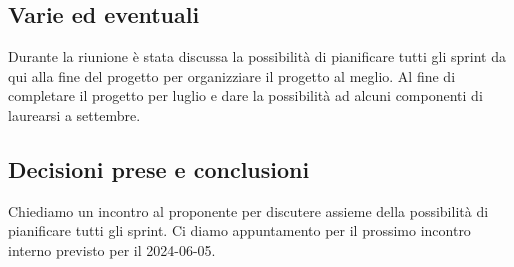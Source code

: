 \documentclass[italian,12pt]{article}
\begin{document}
\subsection{Varie ed eventuali}
Durante la riunione è stata discussa la possibilità di pianificare tutti gli sprint da qui alla fine del progetto per organizziare il progetto al meglio. Al fine di completare il progetto per luglio e dare la possibilità ad alcuni componenti di laurearsi a settembre.

\subsection{Decisioni prese e conclusioni}
Chiediamo un incontro al proponente per discutere assieme della possibilità di pianificare tutti gli sprint.
Ci diamo appuntamento per il prossimo incontro interno previsto per il 2024-06-05.
\end{document}
